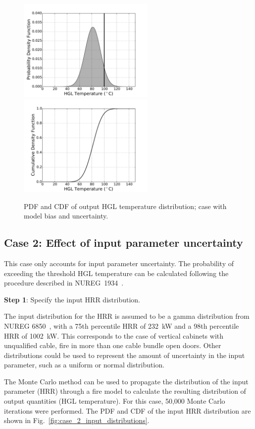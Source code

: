 \documentclass[12pt]{article}
\begin{document}
\begin{figure}[p]
\includegraphics[width=2.6in]{Figures/output_PDF_1_model}
\includegraphics[width=2.6in]{Figures/output_CDF_1_model}
\caption{PDF and CDF of output HGL temperature distribution; case with model bias and uncertainty.}
\label{fig:case_1_output_distributions}
\end{figure}


\clearpage


\subsection{Case 2: Effect of input parameter uncertainty}

This case only accounts for input parameter uncertainty. The probability of exceeding the threshold HGL temperature can be calculated following the procedure described in NUREG~1934~\cite{NUREG_1934}.

\textbf{Step 1}: Specify the input HRR distribution.

The input distribution for the HRR is assumed to be a gamma distribution from NUREG 6850~\cite{NUREG_6850}, with a 75th percentile HRR of 232~kW and a 98th percentile HRR of 1002~kW. This corresponds to the case of vertical cabinets with unqualified cable, fire in more than one cable bundle open doors. Other distributions could be used to represent the amount of uncertainty in the input parameter, such as a uniform or normal distribution.

The Monte Carlo method can be used to propagate the distribution of the input parameter (HRR) through a fire model to calculate the resulting distribution of output quantities (HGL temperature). For this case, 50,000 Monte Carlo iterations were performed. The PDF and CDF of the input HRR distribution are shown in Fig.~\ref{fig:case_2_input_distributions}.
\end{document}
